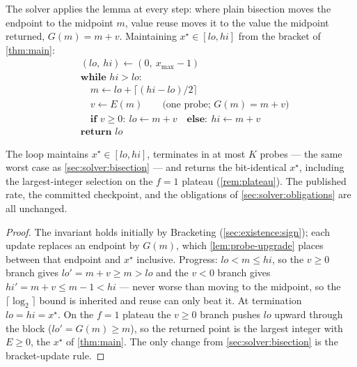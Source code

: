 The solver applies the lemma at every step: where plain bisection moves
the endpoint to the midpoint $m$, value reuse moves it to the value the
midpoint returned, $G(m) = m + v$. Maintaining $x^\star \in [\mathit{lo},
\mathit{hi}]$ from the bracket of \cref{thm:main}:
\[
\begin{aligned}
  &(\mathit{lo},\ \mathit{hi}) \gets (0,\ x_{\max} - 1) \\
  &\textbf{while } \mathit{hi} > \mathit{lo}: \\
  &\quad m \gets \mathit{lo} + \lceil (\mathit{hi} - \mathit{lo})/2 \rceil \\
  &\quad v \gets E(m) \qquad \text{(one probe; } G(m) = m + v \text{)} \\
  &\quad \textbf{if } v \geq 0:\ \mathit{lo} \gets m + v
        \quad \textbf{else}:\ \mathit{hi} \gets m + v \\
  &\textbf{return } \mathit{lo}
\end{aligned}
\]

\begin{proposition}
\label{prop:reuse}
The loop maintains $x^\star \in [\mathit{lo}, \mathit{hi}]$, terminates in
at most $K$ probes --- the same worst case as \cref{sec:solver:bisection}
--- and returns the bit-identical $x^\star$, including the largest-integer
selection on the $f = 1$ plateau (\cref{rem:plateau}). The published rate,
the committed checkpoint, and the obligations of
\cref{sec:solver:obligations} are all unchanged.
\end{proposition}

\begin{proof}
The invariant holds initially by Bracketing
(\cref{sec:existence:sign}); each update replaces an endpoint by $G(m)$,
which \cref{lem:probe-upgrade} places between that endpoint and $x^\star$
inclusive. Progress: $\mathit{lo} < m \leq \mathit{hi}$, so the $v \geq 0$
branch gives $\mathit{lo}' = m + v \geq m > \mathit{lo}$ and the $v < 0$
branch gives $\mathit{hi}' = m + v \leq m - 1 < \mathit{hi}$ --- never
worse than moving to the midpoint, so the $\lceil \log_2 \rceil$ bound is
inherited and reuse can only beat it. At termination $\mathit{lo} =
\mathit{hi} = x^\star$. On the $f = 1$ plateau the $v \geq 0$ branch
pushes $\mathit{lo}$ upward through the block ($\mathit{lo}' = G(m) \geq
m$), so the returned point is the largest integer with $E \geq 0$, the
$x^\star$ of \cref{thm:main}. The only change from
\cref{sec:solver:bisection} is the bracket-update rule.
\end{proof}

